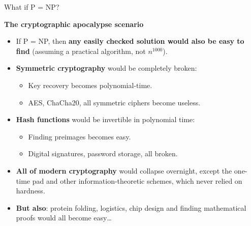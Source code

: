 \ifdefined\PRESENTATION\else\PassOptionsToClass{handout}{beamer}\fi\documentclass[aspectratio=169, lualatex]{beamer}
\begin{document}
\begin{frame}{What if P = NP?}
	\begin{center}
		\Large\textbf{The cryptographic apocalypse scenario}
	\end{center}
	\begin{itemize}[<+->]
		\item If P = NP, then \textbf{any easily checked solution would also be easy to find} (assuming a practical algorithm, not $n^{1000}$).
		\item \textbf{Symmetric cryptography} would be completely broken:
		      \begin{itemize}
			      \item Key recovery becomes polynomial-time.
			      \item AES, ChaCha20, all symmetric ciphers become useless.
		      \end{itemize}
		\item \textbf{Hash functions} would be invertible in polynomial time:
		      \begin{itemize}
			      \item Finding preimages becomes easy.
			      \item Digital signatures, password storage, all broken.
		      \end{itemize}
		\item \textbf{All of modern cryptography} would collapse overnight, except the one-time pad and other information-theoretic schemes, which never relied on hardness.
		\item \textbf{But also}: protein folding, logistics, chip design and finding mathematical proofs would all become easy\ldots
	\end{itemize}
\end{frame}
\end{document}
